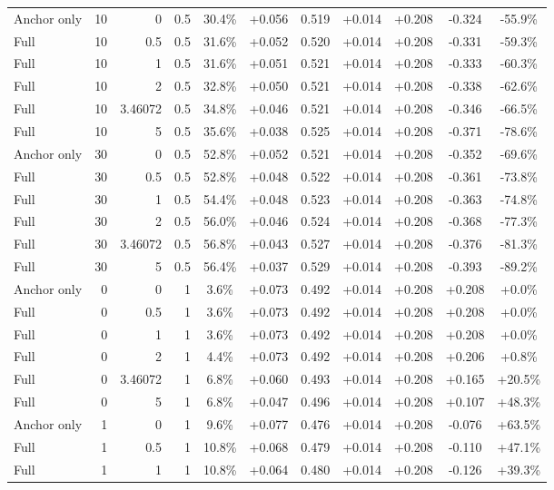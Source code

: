 \begin{table}[htbp]
\begin{tabular}{lrrrccccccc}
Anchor only & 10 & 0 & 0.5 & 30.4\% & +0.056 & 0.519 & +0.014 & +0.208 & -0.324 & -55.9\% \\
Full & 10 & 0.5 & 0.5 & 31.6\% & +0.052 & 0.520 & +0.014 & +0.208 & -0.331 & -59.3\% \\
Full & 10 & 1 & 0.5 & 31.6\% & +0.051 & 0.521 & +0.014 & +0.208 & -0.333 & -60.3\% \\
Full & 10 & 2 & 0.5 & 32.8\% & +0.050 & 0.521 & +0.014 & +0.208 & -0.338 & -62.6\% \\
Full & 10 & 3.46072 & 0.5 & 34.8\% & +0.046 & 0.521 & +0.014 & +0.208 & -0.346 & -66.5\% \\
Full & 10 & 5 & 0.5 & 35.6\% & +0.038 & 0.525 & +0.014 & +0.208 & -0.371 & -78.6\% \\
Anchor only & 30 & 0 & 0.5 & 52.8\% & +0.052 & 0.521 & +0.014 & +0.208 & -0.352 & -69.6\% \\
Full & 30 & 0.5 & 0.5 & 52.8\% & +0.048 & 0.522 & +0.014 & +0.208 & -0.361 & -73.8\% \\
Full & 30 & 1 & 0.5 & 54.4\% & +0.048 & 0.523 & +0.014 & +0.208 & -0.363 & -74.8\% \\
Full & 30 & 2 & 0.5 & 56.0\% & +0.046 & 0.524 & +0.014 & +0.208 & -0.368 & -77.3\% \\
Full & 30 & 3.46072 & 0.5 & 56.8\% & +0.043 & 0.527 & +0.014 & +0.208 & -0.376 & -81.3\% \\
Full & 30 & 5 & 0.5 & 56.4\% & +0.037 & 0.529 & +0.014 & +0.208 & -0.393 & -89.2\% \\
Anchor only & 0 & 0 & 1 & 3.6\% & +0.073 & 0.492 & +0.014 & +0.208 & +0.208 & +0.0\% \\
Full & 0 & 0.5 & 1 & 3.6\% & +0.073 & 0.492 & +0.014 & +0.208 & +0.208 & +0.0\% \\
Full & 0 & 1 & 1 & 3.6\% & +0.073 & 0.492 & +0.014 & +0.208 & +0.208 & +0.0\% \\
Full & 0 & 2 & 1 & 4.4\% & +0.073 & 0.492 & +0.014 & +0.208 & +0.206 & +0.8\% \\
Full & 0 & 3.46072 & 1 & 6.8\% & +0.060 & 0.493 & +0.014 & +0.208 & +0.165 & +20.5\% \\
Full & 0 & 5 & 1 & 6.8\% & +0.047 & 0.496 & +0.014 & +0.208 & +0.107 & +48.3\% \\
Anchor only & 1 & 0 & 1 & 9.6\% & +0.077 & 0.476 & +0.014 & +0.208 & -0.076 & +63.5\% \\
Full & 1 & 0.5 & 1 & 10.8\% & +0.068 & 0.479 & +0.014 & +0.208 & -0.110 & +47.1\% \\
Full & 1 & 1 & 1 & 10.8\% & +0.064 & 0.480 & +0.014 & +0.208 & -0.126 & +39.3\% \\

\end{tabular}
\end{table}
